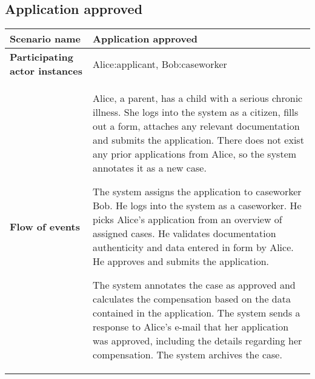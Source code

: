 \subsection*{Application approved}
\begin{table}[htb!]
\begin{tabularx}{\textwidth}{l|X}
	\textbf{Scenario name} & Application approved \\
	\hline
	\textbf{Participating actor instances} & Alice:applicant, Bob:caseworker\\
	\hline
	\textbf{Flow of events} &
	\begin{compactenum}
			\item Alice, a parent, has a child with a serious chronic illness. She logs into the system as a citizen, fills out a form, attaches any relevant documentation and submits the application. There does not exist any prior applications from Alice, so the system annotates it as a new case.
			\item The system assigns the application to caseworker Bob. He logs into the system as a caseworker. He picks Alice's application from an overview of assigned cases. He validates documentation authenticity and data entered in form by Alice. He approves and submits the application.
			\item The system annotates the case as approved and calculates the compensation based on the data contained in the application. The system sends a response to Alice's e-mail that her application was approved, including the details regarding her compensation. The system archives the case.
    \end{compactenum}\\
	\hline
\end{tabularx}
\end{table}

\newpage
